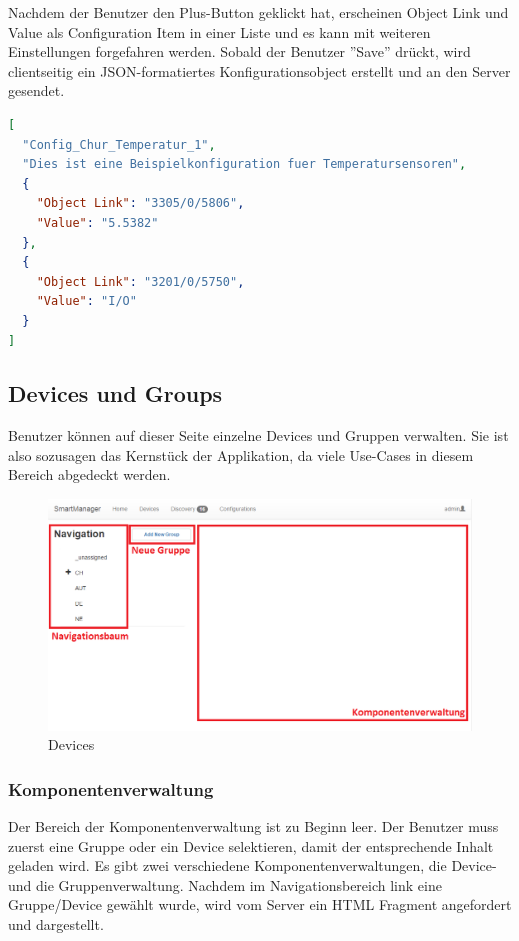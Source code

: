 Nachdem der Benutzer den Plus-Button geklickt hat, erscheinen Object Link und Value als Configuration Item in einer Liste und es kann mit weiteren Einstellungen forgefahren werden. Sobald der Benutzer ''Save'' drückt, wird clientseitig ein JSON-formatiertes Konfigurationsobject erstellt und an den Server gesendet.

\begin{lstlisting}[language=json]
[
  "Config_Chur_Temperatur_1", 
  "Dies ist eine Beispielkonfiguration fuer Temperatursensoren", 
  {
	"Object Link": "3305/0/5806",
	"Value": "5.5382"
  }, 
  {
	"Object Link": "3201/0/5750",
	"Value": "I/O"
  }
]
\end{lstlisting}



\subsection{Devices und Groups}
Benutzer können auf dieser Seite einzelne Devices und Gruppen verwalten. Sie ist also sozusagen das Kernstück der Applikation, da viele Use-Cases in diesem Bereich abgedeckt werden.

\begin{figure}[H]
\centering
\includegraphics[scale=0.57]{../04_Realisierung/images/userinterface/devices_start.png}
\caption{Devices}
\end{figure}

\subsubsection{Komponentenverwaltung}
Der Bereich der Komponentenverwaltung ist zu Beginn leer. Der Benutzer muss zuerst eine Gruppe oder ein Device selektieren, damit der entsprechende Inhalt geladen wird. Es gibt zwei verschiedene Komponentenverwaltungen, die Device- und die Gruppenverwaltung. Nachdem im Navigationsbereich link eine Gruppe/Device gewählt wurde, wird vom Server ein HTML Fragment angefordert und dargestellt.
 \newpage

